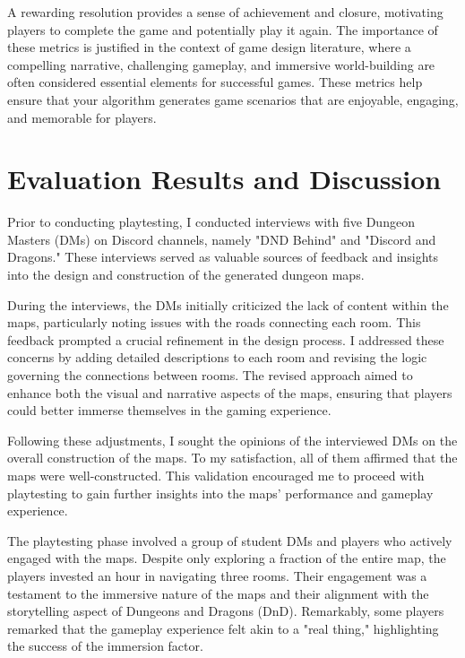 \documentclass[10pt,twocolumn]{article}
\begin{document}
A rewarding resolution provides a sense of achievement and closure, motivating players to complete the game and potentially play it again.
The importance of these metrics is justified in the context of game design literature, where a compelling narrative, challenging gameplay, and immersive world-building are often considered essential elements for successful games. These metrics help ensure that your algorithm generates game scenarios that are enjoyable, engaging, and memorable for players.



\section{Evaluation Results and Discussion}

Prior to conducting playtesting, I conducted interviews with five Dungeon Masters (DMs) on Discord channels, namely "DND Behind" and "Discord and Dragons." These interviews served as valuable sources of feedback and insights into the design and construction of the generated dungeon maps.

During the interviews, the DMs initially criticized the lack of content within the maps, particularly noting issues with the roads connecting each room. This feedback prompted a crucial refinement in the design process. I addressed these concerns by adding detailed descriptions to each room and revising the logic governing the connections between rooms. The revised approach aimed to enhance both the visual and narrative aspects of the maps, ensuring that players could better immerse themselves in the gaming experience.

Following these adjustments, I sought the opinions of the interviewed DMs on the overall construction of the maps. To my satisfaction, all of them affirmed that the maps were well-constructed. This validation encouraged me to proceed with playtesting to gain further insights into the maps' performance and gameplay experience.

The playtesting phase involved a group of student DMs and players who actively engaged with the maps. Despite only exploring a fraction of the entire map, the players invested an hour in navigating three rooms. Their engagement was a testament to the immersive nature of the maps and their alignment with the storytelling aspect of Dungeons and Dragons (DnD). Remarkably, some players remarked that the gameplay experience felt akin to a "real thing," highlighting the success of the immersion factor.
\end{document}
